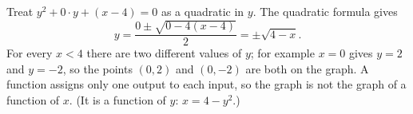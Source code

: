 Treat $y^2+0\cdot y+(x-4)=0$ as a quadratic in $y$. The quadratic formula gives
\[
y=\dfrac{0\pm\sqrt{0-4(x-4)}}{2}=\pm\sqrt{4-x}.
\]
For every $x<4$ there are two different values of $y$; for example $x=0$ gives $y=2$ and $y=-2$, so the points $(0,2)$ and $(0,-2)$ are both on the graph. A function assigns only one output to each input, so the graph is not the graph of a function of $x$. (It is a function of $y$: $x=4-y^2$.)
